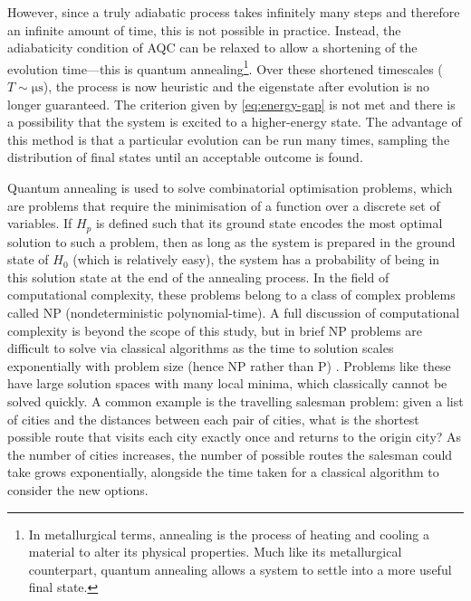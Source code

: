 \documentclass[twocolumn]{article}
\theoremstyle{definition}
\begin{document}
However, since a truly adiabatic process takes infinitely many steps and therefore an infinite amount of time, this is not possible in practice. Instead, the adiabaticity condition of AQC can be relaxed to allow a shortening of the evolution time---this is quantum annealing\footnote{In metallurgical terms, annealing is the process of heating and cooling a material to alter its physical properties. Much like its metallurgical counterpart, quantum annealing allows a system to settle into a more useful final state.}. Over these shortened timescales ($T\sim\unit{\us}$), the process is now heuristic and the eigenstate after evolution is no longer guaranteed. The criterion given by \cref{eq:energy-gap} is not met and there is a possibility that the system is excited to a higher-energy state. The advantage of this method is that a particular evolution can be run many times, sampling the distribution of final states until an acceptable outcome is found.

Quantum annealing is used to solve combinatorial optimisation problems, which are problems that require the minimisation of a function over a discrete set of variables. If $H_p$ is defined such that its ground state encodes the most optimal solution to such a problem, then as long as the system is prepared in the ground state of $H_0$ (which is relatively easy), the system has a probability of being in this solution state at the end of the annealing process. In the field of computational complexity, these problems belong to a class of complex problems called NP (nondeterministic polynomial-time). A full discussion of computational complexity is beyond the scope of this study, but in brief NP problems are difficult to solve via classical algorithms as the time to solution scales exponentially with problem size (hence NP rather than P) \cite{au-yeung_np-hard_2023}. Problems like these have large solution spaces with many local minima, which classically cannot be solved quickly. A common example is the travelling salesman problem: given a list of cities and the distances between each pair of cities, what is the shortest possible route that visits each city exactly once and returns to the origin city? As the number of cities increases, the number of possible routes the salesman could take grows exponentially, alongside the time taken for a classical algorithm to consider the new options.
\end{document}
